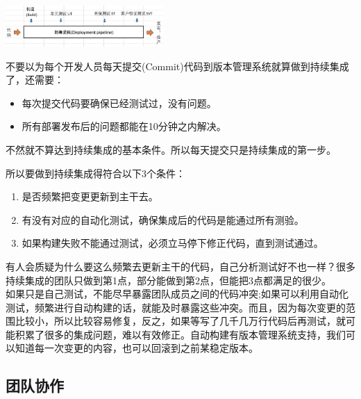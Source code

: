 
\includegraphics[width=6cm]{!DeployPipelineScreenshot_2022-05-20_210104.jpg}

不要以为每个开发人员每天提交(Commit)代码到版本管理系统就算做到持续集成了，还需要：

\begin{itemize}
\tightlist
\item
  每次提交代码要确保已经测试过，没有问题。
\item
  所有部署发布后的问题都能在10分钟之内解决。
\end{itemize}

不然就不算达到持续集成的基本条件。所以每天提交只是持续集成的第一步。

所以要做到持续集成得符合以下3个条件：

\begin{enumerate}
\tightlist
\item
  是否频繁把变更更新到主干去。
\item
  有没有对应的自动化测试，确保集成后的代码是能通过所有测验。
\item
  如果构建失败不能通过测试，必须立马停下修正代码，直到测试通过。\\
\end{enumerate}

有人会质疑为什么要这么频繁去更新主干的代码，自己分析测试好不也一样？很多持续集成的团队只做到第1点，部分能做到第2点，但能把3点都满足的很少。\\
如果只是自己测试，不能尽早暴露团队成员之间的代码冲突;如果可以利用自动化测试，频繁进行自动构建的话，就能及时暴露这些冲突。而且，因为每次变更的范围比较小，所以比较容易修复，反之，如果等写了几千几万行代码后再测试，就可能积累了很多的集成问题，难以有效修正。自动构建有版本管理系统支持，我们可以知道每一次变更的内容，也可以回滚到之前某稳定版本。

\hypertarget{ux56e2ux961fux534fux4f5c}{%
\subsection{团队协作}\label{ux56e2ux961fux534fux4f5c}}

